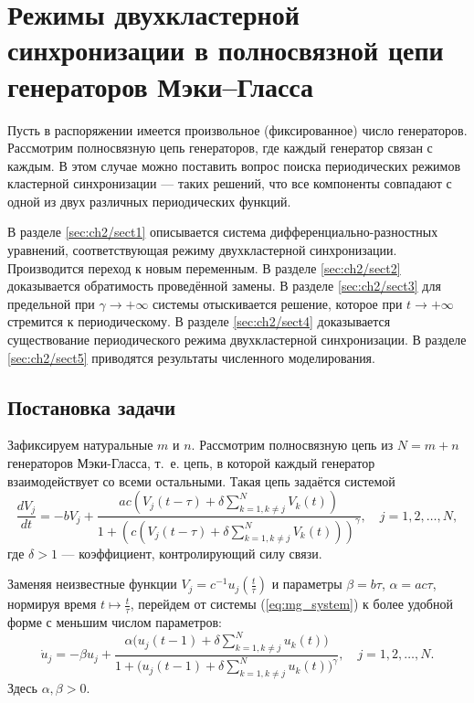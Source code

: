\chapter{Режимы двухкластерной синхронизации в полносвязной цепи генераторов Мэки--Гласса}\label{ch:ch3}


Пусть в распоряжении имеется произвольное (фиксированное) число генераторов. Рассмотрим полносвязную цепь генераторов, где каждый генератор связан с каждым. В этом случае можно поставить вопрос поиска периодических режимов кластерной синхронизации --- таких решений, что все компоненты совпадают с одной из двух различных периодических функций.

В разделе \ref{sec:ch2/sect1} описывается система дифференциально-разностных уравнений, соответствующая режиму двухкластерной синхронизации. Производится переход к новым переменным. В разделе \ref{sec:ch2/sect2} доказывается обратимость проведённой замены. В разделе \ref{sec:ch2/sect3} для предельной при $\gamma \to +\infty$ системы отыскивается решение, которое при $t \to +\infty$ стремится к периодическому. В разделе \ref{sec:ch2/sect4} доказывается существование периодического режима двухкластерной синхронизации. В разделе \ref{sec:ch2/sect5} приводятся результаты численного моделирования.

\section{Постановка задачи}\label{sec:ch3/sect1}
Зафиксируем натуральные $m$ и $n$. Рассмотрим полносвязную цепь из $N = m + n$ генераторов Мэки-Гласса, т.~е. цепь, в которой каждый генератор взаимодействует со всеми остальными. Такая цепь задаётся системой
%
\begin{equation}
	\label{eq:mg_system}
	\dfrac{d V_{j}}{dt}= -bV_{j} + \dfrac{ac\left(V_{j}(t - \tau) + \delta\sum_{k=1,k\neq j}^{N}V_{k}(t)\right)}{1 + \left(c\left(V_{j}(t - \tau) + \delta\sum_{k=1,k\neq j}^{N}V_{k}(t)\right)\right)^{\gamma}}, \quad j=1, 2, \ldots, N,
\end{equation}
где $\delta > 1$ --- коэффициент, контролирующий силу связи. 

Заменяя неизвестные функции $V_j = c^{-1}u_j(\frac{t}{\tau})$ и параметры $\beta = b\tau$, $\alpha=ac\tau$, 
нормируя время $t \mapsto \frac{t}{\tau}$,
перейдем от системы (\ref{eq:mg_system}) к более удобной форме с меньшим числом параметров:
%
\begin{equation}
	\label{eq:mg_system_norm}
	\dot{u}_j=-\beta u_j+\frac{\alpha\big(u_j(t - 1) + \delta\sum_{k = 1, k\neq j}^{N}u_{k}(t)\big)}{1+\big(u_j(t - 1) + \delta\sum_{k = 1, k \neq j}^{N}u_{k}(t)\big)^\gamma}, \quad j = 1, 2, \ldots, N.
\end{equation}
%
Здесь $\alpha, \beta > 0$.

